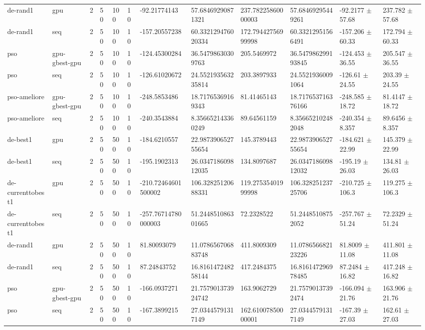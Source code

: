 \begin{table}[t]
\begin{tabular}{llllllllllll}
de-rand1 & gpu & 2 & 50 & 100 & 10 & -92.21774143 & 57.68469290871321 & 237.78225860000003 & 57.68469295449261 & -92.2177 $\pm$ 57.68 & 237.782 $\pm$ 57.68 \\
de-rand1 & seq & 2 & 50 & 100 & 10 & -157.20557238 & 60.332129476020334 & 172.79442756999998 & 60.33212951566491 & -157.206 $\pm$ 60.33 & 172.794 $\pm$ 60.33 \\
pso & gpu-gbest-gpu & 2 & 50 & 100 & 10 & -124.45300284 & 36.54798630309763 & 205.5469972 & 36.547986299193845 & -124.453 $\pm$ 36.55 & 205.547 $\pm$ 36.55 \\
pso & seq & 2 & 50 & 100 & 10 & -126.61020672 & 24.552193563235814 & 203.3897933 & 24.55219360091064 & -126.61 $\pm$ 24.55 & 203.39 $\pm$ 24.55 \\
pso-ameliore & gpu-gbest-gpu & 2 & 50 & 100 & 10 & -248.5853486 & 18.71765369169343 & 81.41465143 & 18.717653716376166 & -248.585 $\pm$ 18.72 & 81.4147 $\pm$ 18.72 \\
pso-ameliore & seq & 2 & 50 & 100 & 10 & -240.3543884 & 8.356652143360249 & 89.64561159 & 8.356652102482048 & -240.354 $\pm$ 8.357 & 89.6456 $\pm$ 8.357 \\
de-best1 & gpu & 2 & 50 & 500 & 10 & -184.6210557 & 22.987390652755654 & 145.3789443 & 22.987390652755654 & -184.621 $\pm$ 22.99 & 145.379 $\pm$ 22.99 \\
de-best1 & seq & 2 & 50 & 500 & 10 & -195.1902313 & 26.034718609812035 & 134.8097687 & 26.034718609812032 & -195.19 $\pm$ 26.03 & 134.81 $\pm$ 26.03 \\
de-currenttobest1 & gpu & 2 & 50 & 500 & 10 & -210.72464601500002 & 106.32825120688331 & 119.27535401999998 & 106.32825123725706 & -210.725 $\pm$ 106.3 & 119.275 $\pm$ 106.3 \\
de-currenttobest1 & seq & 2 & 50 & 500 & 10 & -257.76714780000003 & 51.244851086301665 & 72.2328522 & 51.24485108752052 & -257.767 $\pm$ 51.24 & 72.2329 $\pm$ 51.24 \\
de-rand1 & gpu & 2 & 50 & 500 & 10 & 81.80093079 & 11.078656706883748 & 411.8009309 & 11.078656682123226 & 81.8009 $\pm$ 11.08 & 411.801 $\pm$ 11.08 \\
de-rand1 & seq & 2 & 50 & 500 & 10 & 87.24843752 & 16.816147248258144 & 417.2484375 & 16.816147296978485 & 87.2484 $\pm$ 16.82 & 417.248 $\pm$ 16.82 \\
pso & gpu-gbest-gpu & 2 & 50 & 500 & 10 & -166.0937271 & 21.757901373924742 & 163.9062729 & 21.75790137392474 & -166.094 $\pm$ 21.76 & 163.906 $\pm$ 21.76 \\
pso & seq & 2 & 50 & 500 & 10 & -167.3899215 & 27.03445791317149 & 162.61007850000001 & 27.03445791317149 & -167.39 $\pm$ 27.03 & 162.61 $\pm$ 27.03 \\

\end{tabular}
\end{table}
